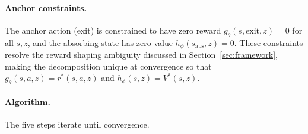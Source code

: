 \paragraph{Anchor constraints.}
The anchor action (exit) is constrained to have zero reward $g_\theta(s, \text{exit}, z) = 0$ for all $s, z$, and the absorbing state has zero value $h_\phi(s_{\text{abs}}, z) = 0$.
These constraints resolve the reward shaping ambiguity discussed in Section~\ref{sec:framework}, making the decomposition unique at convergence so that $g_\theta(s, a, z) = r^*(s, a, z)$ and $h_\phi(s, z) = V^*(s, z)$.

\paragraph{Algorithm.}
The five steps iterate until convergence.

